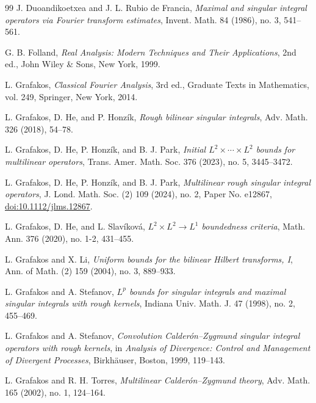 \documentclass[11pt]{amsart}
\theoremstyle{remark}
\numberwithin{equation}{section}
\begin{document}
\begin{thebibliography}{99}
		J. Duoandikoetxea and J. L. Rubio de Francia,
		\emph{Maximal and singular integral operators via Fourier transform
			estimates},
		Invent. Math. 84 (1986), no. 3, 541--561.
		
		G. B. Folland,
		\emph{Real Analysis: Modern Techniques and Their Applications},
		2nd ed., John Wiley \& Sons, New York, 1999.
		
		L. Grafakos,
		\emph{Classical Fourier Analysis},
		3rd ed., Graduate Texts in Mathematics, vol. 249,
		Springer, New York, 2014.
		
		L. Grafakos, D. He, and P. Honz\'ik,
		\emph{Rough bilinear singular integrals},
		Adv. Math. 326 (2018), 54--78.
		
		L. Grafakos, D. He, P. Honz\'ik, and B. J. Park,
		\emph{Initial \(L^2\times\cdots\times L^2\) bounds for multilinear
			operators},
		Trans. Amer. Math. Soc. 376 (2023), no. 5, 3445--3472.
		
		L. Grafakos, D. He, P. Honz\'ik, and B. J. Park,
		\emph{Multilinear rough singular integral operators},
		J. Lond. Math. Soc. (2) 109 (2024), no. 2, Paper No. e12867,
		\href{https://doi.org/10.1112/jlms.12867}{doi:10.1112/jlms.12867}.

		L. Grafakos, D. He, and L. Slav\'ikov\'a,
		\emph{\(L^2\times L^2\to L^1\) boundedness criteria},
		Math. Ann. 376 (2020), no. 1-2, 431--455.
		
		L. Grafakos and X. Li,
		\emph{Uniform bounds for the bilinear Hilbert transforms, I},
		Ann. of Math. (2) 159 (2004), no. 3, 889--933.
		
		L. Grafakos and A. Stefanov,
		\emph{\(L^p\) bounds for singular integrals and maximal singular integrals
			with rough kernels},
		Indiana Univ. Math. J. 47 (1998), no. 2, 455--469.
		
		L. Grafakos and A. Stefanov,
		\emph{Convolution Calder\'on--Zygmund singular integral operators with rough
			kernels},
		in \emph{Analysis of Divergence: Control and Management of Divergent
			Processes}, Birkh\"auser, Boston, 1999, 119--143.
		
		L. Grafakos and R. H. Torres,
		\emph{Multilinear Calder\'on--Zygmund theory},
		Adv. Math. 165 (2002), no. 1, 124--164.
		

\end{thebibliography}
\end{document}
